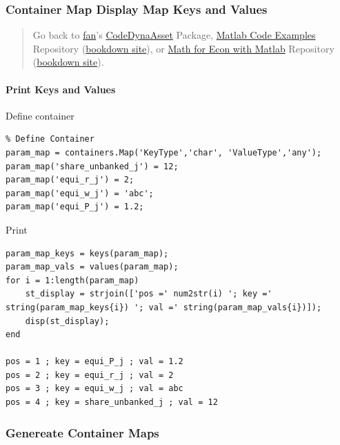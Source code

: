 \documentclass[
]{book}
\begin{document}
\hypertarget{container-map-display-map-keys-and-values}{%
\subsubsection{Container Map Display Map Keys and Values}\label{container-map-display-map-keys-and-values}}

\begin{quote}
Go back to \href{http://fanwangecon.github.io/}{fan}'s \href{https://fanwangecon.github.io/CodeDynaAsset/}{CodeDynaAsset} Package, \href{https://fanwangecon.github.io/M4Econ/}{Matlab Code Examples} Repository (\href{https://fanwangecon.github.io/M4Econ/bookdown}{bookdown site}), or \href{https://fanwangecon.github.io/Math4Econ/}{Math for Econ with Matlab} Repository (\href{https://fanwangecon.github.io/Math4Econ/bookdown}{bookdown site}).
\end{quote}

\hypertarget{print-keys-and-values}{%
\paragraph{Print Keys and Values}\label{print-keys-and-values}}

Define container

\begin{verbatim}
% Define Container
param_map = containers.Map('KeyType','char', 'ValueType','any');
param_map('share_unbanked_j') = 12;
param_map('equi_r_j') = 2;
param_map('equi_w_j') = 'abc';
param_map('equi_P_j') = 1.2;
\end{verbatim}

Print

\begin{verbatim}
param_map_keys = keys(param_map);
param_map_vals = values(param_map);
for i = 1:length(param_map)
    st_display = strjoin(['pos =' num2str(i) '; key =' string(param_map_keys{i}) '; val =' string(param_map_vals{i})]);
    disp(st_display);
end

pos = 1 ; key = equi_P_j ; val = 1.2
pos = 2 ; key = equi_r_j ; val = 2
pos = 3 ; key = equi_w_j ; val = abc
pos = 4 ; key = share_unbanked_j ; val = 12
\end{verbatim}

\hypertarget{genereate-container-maps}{%
\subsubsection{Genereate Container Maps}\label{genereate-container-maps}}
\end{document}
